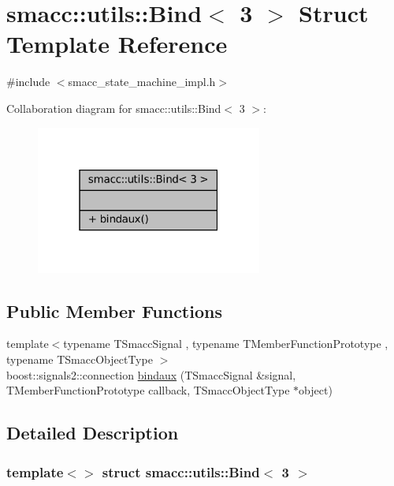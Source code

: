 \hypertarget{structsmacc_1_1utils_1_1Bind_3_013_01_4}{}\section{smacc\+:\+:utils\+:\+:Bind$<$ 3 $>$ Struct Template Reference}
\label{structsmacc_1_1utils_1_1Bind_3_013_01_4}


{\ttfamily \#include $<$smacc\+\_\+state\+\_\+machine\+\_\+impl.\+h$>$}



Collaboration diagram for smacc\+:\+:utils\+:\+:Bind$<$ 3 $>$\+:
\nopagebreak
\begin{figure}[H]
\begin{center}
\leavevmode
\includegraphics[width=211pt]{structsmacc_1_1utils_1_1Bind_3_013_01_4__coll__graph}
\end{center}
\end{figure}
\subsection*{Public Member Functions}
\begin{DoxyCompactItemize}
\item 
{\footnotesize template$<$typename T\+Smacc\+Signal , typename T\+Member\+Function\+Prototype , typename T\+Smacc\+Object\+Type $>$ }\\boost\+::signals2\+::connection \hyperlink{structsmacc_1_1utils_1_1Bind_3_013_01_4_a8958f16a2a40b187e6500a76cfaeed63}{bindaux} (T\+Smacc\+Signal \&signal, T\+Member\+Function\+Prototype callback, T\+Smacc\+Object\+Type $\ast$object)
\end{DoxyCompactItemize}


\subsection{Detailed Description}
\subsubsection*{template$<$$>$\newline
struct smacc\+::utils\+::\+Bind$<$ 3 $>$}



